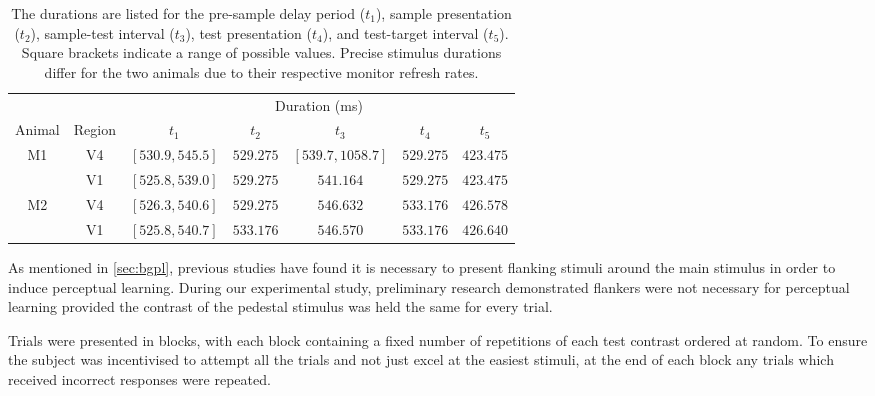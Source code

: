 \begin{table}[bthp]
{%
%
\begin{tabular}{ccccccc}
\toprule
         &          & \multicolumn{5}{c}{Duration (\si{\milli\second})} \\
\cmidrule(l){3-7}
Animal   & Region   & $t_1$            & $t_2$     & $t_3$             & $t_4$     & $t_5$     \\
\midrule
\acs{M1} & \acs{V4} & $[530.9, 545.5]$ & $529.275$ & $[539.7, 1058.7]$ & $529.275$ & $423.475$ \\
         & \acs{V1} & $[525.8, 539.0]$ & $529.275$ & $541.164$         & $529.275$ & $423.475$ \\
\acs{M2} & \acs{V4} & $[526.3, 540.6]$ & $529.275$ & $546.632$         & $533.176$ & $426.578$ \\
         & \acs{V1} & $[525.8, 540.7]$ & $533.176$ & $546.570$         & $533.176$ & $426.640$ \\
\bottomrule
%
\end{tabular}
} %
\caption{
The durations are listed for the
pre-sample delay period ($t_1$),
sample presentation ($t_2$),
sample-test interval ($t_3$),
test presentation ($t_4$), and
test-target interval ($t_5$).
Square brackets indicate a range of possible values.
Precise stimulus durations differ for the two animals due to their respective monitor refresh rates.
}
\label{tab:tptimes}
\end{table}


As mentioned in \autoref{sec:bgpl}, previous studies have found it is necessary to present flanking stimuli around the main stimulus in order to induce perceptual learning.
During our experimental study, preliminary research demonstrated flankers were not necessary for perceptual learning provided the contrast of the pedestal stimulus was held the same for every trial.

Trials were presented in blocks, with each block containing a fixed number of repetitions of each test contrast ordered at random.
To ensure the subject was incentivised to attempt all the trials and not just excel at the easiest stimuli, at the end of each block any trials which received incorrect responses were repeated.


